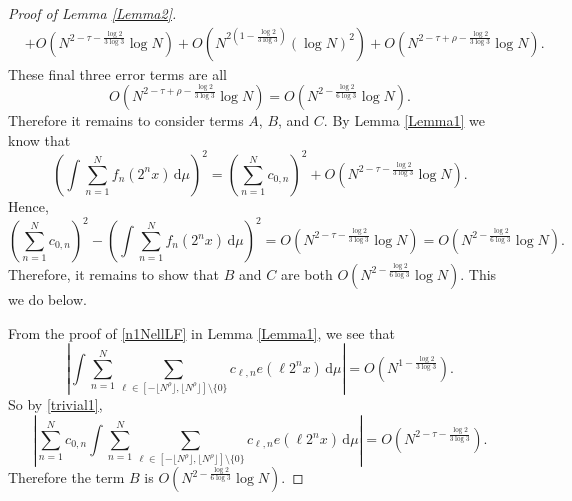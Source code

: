 \documentclass[10pt,a4paper]{amsart}
\numberwithin{equation}{section} %
\begin{document}
\begin{proof}[Proof of Lemma \ref{Lemma2}]
\begin{align*}
		&+O\left(N^{2-\tau-\frac{\log2}{3\log3}}\log N\right)+O\left(N^{2(1-\frac{\log2}{3\log3})}(\log N)^2\right)+O\left(N^{2-\tau+\rho-\frac{\log2}{3\log3}}\log N\right) .
	\end{align*} 
    These final three error terms are all $$O\left(N^{2-\tau+\rho-\frac{\log2}{3\log3}}\log N\right)=O\left(N^{2-\frac{\log2}{6\log3}}\log N\right).$$ Therefore it remains to consider terms $A$, $B$, and $C$. By Lemma \ref{Lemma1} we know that 
	$$\left(\int \sum_{n=1}^{N}f_{n}(2^nx)\, \mathrm{d}\mu\right)^{2} = \left(\sum_{n=1}^{N}c_{0,n}\right)^{2}+O\left(N^{2-\tau-\frac{\log2}{3\log3}}\log N\right).$$ Hence,
	$$\left(\sum_{n=1}^{N}c_{0,n}\right)^{2}-\left( \int \sum_{n=1}^{N}f_{n}(2^nx)\, \mathrm{d}\mu\right)^2=O\left(N^{2-\tau-\frac{\log2}{3\log3}}\log N\right)=O\left(N^{2-\frac{\log2}{6\log3}}\log N\right).$$
	Therefore, it remains to show that $B$ and $C$ are both $O\left(N^{2-\frac{\log2}{6\log3}}\log N\right)$. This we do below.
	
From the proof of \eqref{n1NellLF} in Lemma \ref{Lemma1}, we see that $$\left|\int \sum_{n=1}^{N}\sum_{\ell\in [-\lfloor N^{ \rho}\rfloor,\lfloor N^{\rho}\rfloor]\setminus \{0\}}c_{\ell,n}e(\ell 2^nx)\, \mathrm{d}\mu\right|=O\left(N^{1-\frac{\log2}{3\log3}}\right).$$ So by \eqref{trivial1},
	$$\left|\sum_{n=1}^{N}c_{0,n}\int \sum_{n=1}^{N}\sum_{\ell\in [-\lfloor N^{ \rho}\rfloor,\lfloor N^{\rho}\rfloor]\setminus \{0\}}c_{\ell,n}e(\ell 2^nx)\, \mathrm{d}\mu\right|=O\left(  N^{2-\tau-\frac{\log2}{3\log3}}\right).$$
	Therefore the term $B$ is $O\left(N^{2-\frac{\log2}{6\log3}}\log N\right).$
	

\end{proof}
\end{document}
